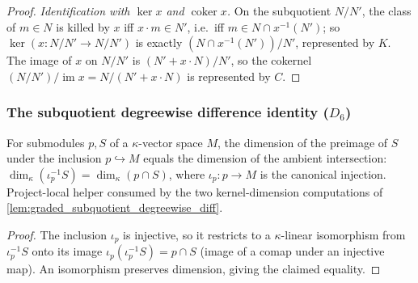\begin{proof}
  \emph{Identification with \(\ker x\) and \(\operatorname{coker} x\).} On the
  subquotient \(N/N'\), the class of \(m \in N\) is killed by \(x\) iff
  \(x \cdot m \in N'\), i.e.\ iff \(m \in N \cap x^{-1}(N')\); so \(\ker(x : N/N' \to
  N/N')\) is exactly \((N \cap x^{-1}(N'))/N'\), represented by \(K\). The image of
  \(x\) on \(N/N'\) is \((N' + x \cdot N)/N'\), so the cokernel
  \((N/N')/\operatorname{im} x = N/(N' + x \cdot N)\) is represented by \(C\).
\end{proof}

\subsubsection*{The subquotient degreewise difference identity ($D_6$)}

\begin{lemma}\leanok
  \label{lem:graded_finrank_comap_subtype}
  For submodules \(p, S\) of a \(\kappa\)-vector space \(M\), the dimension of the
  preimage of \(S\) under the inclusion \(p \hookrightarrow M\) equals the dimension of
  the ambient intersection: \(\dim_\kappa(\iota_p^{-1} S) = \dim_\kappa(p \cap S)\),
  where \(\iota_p : p \to M\) is the canonical injection. Project-local helper consumed
  by the two kernel-dimension computations of \cref{lem:graded_subquotient_degreewise_diff}.
\end{lemma}
\begin{proof}

\leanok
  The inclusion \(\iota_p\) is injective, so it restricts to a \(\kappa\)-linear
  isomorphism from \(\iota_p^{-1} S\) onto its image \(\iota_p(\iota_p^{-1} S) = p \cap S\)
  (image of a comap under an injective map). An isomorphism preserves dimension, giving
  the claimed equality.
\end{proof}

